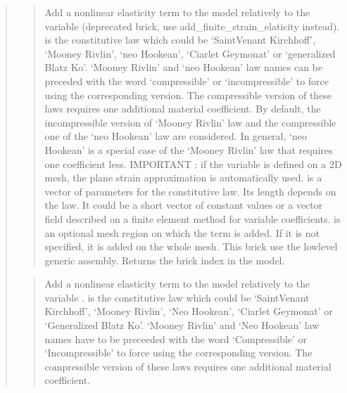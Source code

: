 \documentclass[a4paper,11pt,english]{sphinxmanual}
\begin{document}
\begin{quote}
\begin{quote}

Add a nonlinear elasticity term to the model relatively to the
variable  (deprecated brick, use add\_finite\_strain\_elaticity
instead).  is the constitutive law which
could be ‘SaintVenant Kirchhoff’, ‘Mooney Rivlin’, ‘neo Hookean’,
‘Ciarlet Geymonat’ or ‘generalized Blatz Ko’.
‘Mooney Rivlin’ and ‘neo Hookean’ law names can be preceded with the word
‘compressible’ or ‘incompressible’ to force using the corresponding version.
The compressible version of these laws requires one additional material
coefficient. By default, the incompressible version of ‘Mooney Rivlin’ law
and the compressible one of the ‘neo Hookean’ law are considered. In
general, ‘neo Hookean’ is a special case of the ‘Mooney Rivlin’ law that
requires one coefficient less.
IMPORTANT : if the variable is defined on a 2D mesh, the plane strain
approximation is automatically used.
 is a vector of parameters for the constitutive law. Its length
depends on the law. It could be a short vector of constant values or a
vector field described on a finite element method for variable
coefficients.  is an optional mesh region on which the term
is added. If it is not specified, it is added on the whole mesh.
This brick use the low\sphinxhyphen{}level generic assembly.
Returns the brick index in the model.
\end{quote}

\begin{quote}

Add a nonlinear elasticity term to the model relatively to the
variable .  is the constitutive law which
could be ‘SaintVenant Kirchhoff’, ‘Mooney Rivlin’, ‘Neo Hookean’,
‘Ciarlet Geymonat’ or ‘Generalized Blatz Ko’.
‘Mooney Rivlin’ and ‘Neo Hookean’ law names have to be preceeded with
the word ‘Compressible’ or ‘Incompressible’ to force using the
corresponding version.
The compressible version of these laws requires one additional material
coefficient.


\end{quote}
\end{quote}
\end{document}
